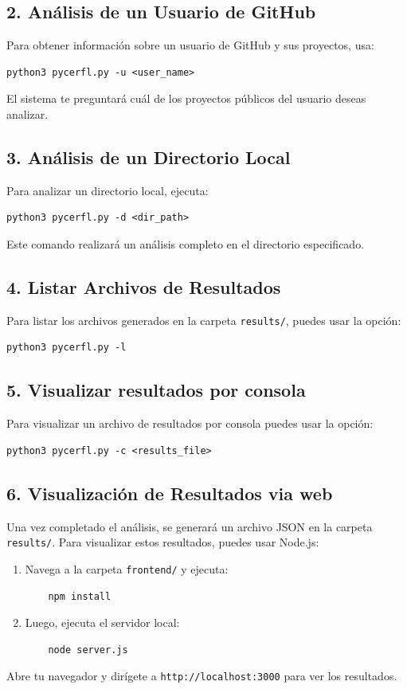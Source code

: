 \documentclass[a4paper, 12pt]{book}
\begin{document}
\subsection{2. Análisis de un Usuario de GitHub}
Para obtener información sobre un usuario de GitHub y sus proyectos, usa:
\begin{verbatim}
python3 pycerfl.py -u <user_name>
\end{verbatim}
El sistema te preguntará cuál de los proyectos públicos del usuario deseas analizar.

\subsection{3. Análisis de un Directorio Local}
Para analizar un directorio local, ejecuta:
\begin{verbatim}
python3 pycerfl.py -d <dir_path>
\end{verbatim}
Este comando realizará un análisis completo en el directorio especificado.

\subsection{4. Listar Archivos de Resultados}
Para listar los archivos generados en la carpeta \texttt{results/}, puedes usar la opción:
\begin{verbatim}
python3 pycerfl.py -l
\end{verbatim}

\subsection{5. Visualizar resultados por consola}
Para visualizar un archivo de resultados por consola puedes usar la opción:
\begin{verbatim}
python3 pycerfl.py -c <results_file>
\end{verbatim}
\subsection{6. Visualización de Resultados via web}
Una vez completado el análisis, se generará un archivo JSON en la carpeta \texttt{results/}. Para visualizar estos resultados, puedes usar Node.js:
\begin{enumerate}
    \item Navega a la carpeta \texttt{frontend/} y ejecuta:
    \begin{verbatim}
    npm install
    \end{verbatim}
    \item Luego, ejecuta el servidor local:
    \begin{verbatim}
    node server.js
    \end{verbatim}
\end{enumerate}
Abre tu navegador y dirígete a \texttt{http://localhost:3000} para ver los resultados.
\end{document}
